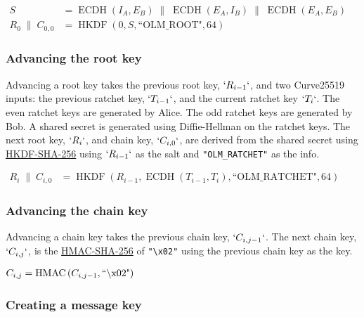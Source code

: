 \documentclass[10pt]{article}
\begin{document}
$\begin{aligned}
    S&=\operatorname{ECDH}\left(I_A,E_B\right)\;\parallel\;
       \operatorname{ECDH}\left(E_A,I_B\right)\;\parallel\;
       \operatorname{ECDH}\left(E_A,E_B\right)\\
    R_0\;\parallel\;C_{0,0}&=
        \operatorname{HKDF}\left(0,S,\text{``OLM\_ROOT"},64\right)
\end{aligned}$

\subsubsection{Advancing the root key}\label{advancing-the-root-key}

Advancing a root key takes the previous root key, \(`R_{i-1}`\), and two
Curve25519 inputs: the previous ratchet key, \(`T_{i-1}`\), and the
current ratchet key \(`T_i`\). The even ratchet keys are generated by
Alice. The odd ratchet keys are generated by Bob. A shared secret is
generated using Diffie-Hellman on the ratchet keys. The next root key,
\(`R_i`\), and chain key, \(`C_{i,0}`\), are derived from the shared
secret using \href{https://tools.ietf.org/html/rfc5869}{HKDF-SHA-256}
using \(`R_{i-1}`\) as the salt and \texttt{"OLM\_RATCHET"} as the info.

$\begin{aligned}
    R_i\;\parallel\;C_{i,0}&=
        \operatorname{HKDF}\left(
            R_{i-1},
            \operatorname{ECDH}\left(T_{i-1},T_i\right),
            \text{``OLM\_RATCHET"},
            64
        \right)
\end{aligned}$

\subsubsection{Advancing the chain key}\label{advancing-the-chain-key}

Advancing a chain key takes the previous chain key, \(`C_{i,j-1}`\). The
next chain key, \(`C_{i,j}`\), is the
\href{https://tools.ietf.org/html/rfc2104}{HMAC-SHA-256} of
\texttt{"\textbackslash{}x02"} using the previous chain key as the key.

$\begin{aligned}
    C_{i,j}&=\operatorname{HMAC}\left(C_{i,j-1},\text{``\char`\\x02"}\right)
\end{aligned}$

\subsubsection{Creating a message key}\label{creating-a-message-key}
\end{document}
